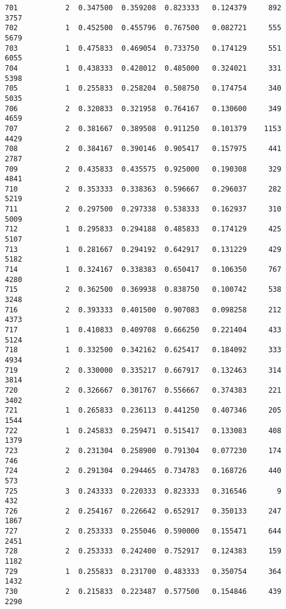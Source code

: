 \documentclass[11pt]{article}
\begin{document}
\begin{Verbatim}[commandchars=\\\{\}]
701           2  0.347500  0.359208  0.823333   0.124379     892        3757   
702           1  0.452500  0.455796  0.767500   0.082721     555        5679   
703           1  0.475833  0.469054  0.733750   0.174129     551        6055   
704           1  0.438333  0.428012  0.485000   0.324021     331        5398   
705           1  0.255833  0.258204  0.508750   0.174754     340        5035   
706           2  0.320833  0.321958  0.764167   0.130600     349        4659   
707           2  0.381667  0.389508  0.911250   0.101379    1153        4429   
708           2  0.384167  0.390146  0.905417   0.157975     441        2787   
709           2  0.435833  0.435575  0.925000   0.190308     329        4841   
710           2  0.353333  0.338363  0.596667   0.296037     282        5219   
711           2  0.297500  0.297338  0.538333   0.162937     310        5009   
712           1  0.295833  0.294188  0.485833   0.174129     425        5107   
713           1  0.281667  0.294192  0.642917   0.131229     429        5182   
714           1  0.324167  0.338383  0.650417   0.106350     767        4280   
715           2  0.362500  0.369938  0.838750   0.100742     538        3248   
716           2  0.393333  0.401500  0.907083   0.098258     212        4373   
717           1  0.410833  0.409708  0.666250   0.221404     433        5124   
718           1  0.332500  0.342162  0.625417   0.184092     333        4934   
719           2  0.330000  0.335217  0.667917   0.132463     314        3814   
720           2  0.326667  0.301767  0.556667   0.374383     221        3402   
721           1  0.265833  0.236113  0.441250   0.407346     205        1544   
722           1  0.245833  0.259471  0.515417   0.133083     408        1379   
723           2  0.231304  0.258900  0.791304   0.077230     174         746   
724           2  0.291304  0.294465  0.734783   0.168726     440         573   
725           3  0.243333  0.220333  0.823333   0.316546       9         432   
726           2  0.254167  0.226642  0.652917   0.350133     247        1867   
727           2  0.253333  0.255046  0.590000   0.155471     644        2451   
728           2  0.253333  0.242400  0.752917   0.124383     159        1182   
729           1  0.255833  0.231700  0.483333   0.350754     364        1432   
730           2  0.215833  0.223487  0.577500   0.154846     439        2290   


\end{Verbatim}
\end{document}
